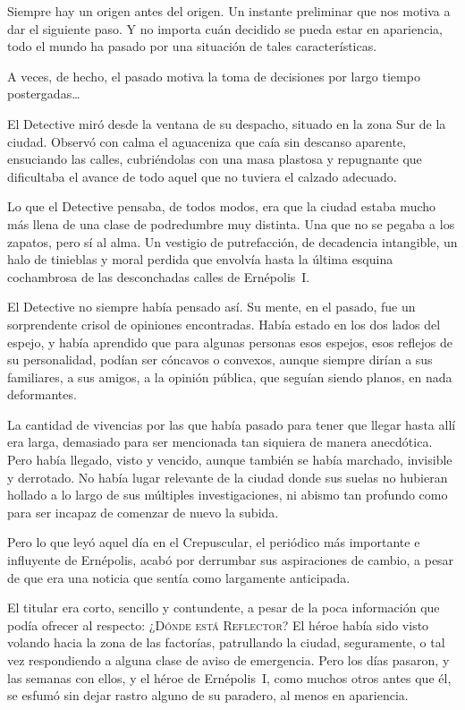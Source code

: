 Siempre hay un origen antes del origen. Un instante preliminar que nos motiva a dar el siguiente paso. Y no importa cuán decidido se pueda estar en apariencia, todo el mundo ha pasado por una situación de tales características.

A veces, de hecho, el pasado motiva la toma de decisiones por largo tiempo postergadas\dots

\fancyparbreak
El Detective miró desde la ventana de su despacho, situado en la zona Sur de la ciudad. Observó con calma el aguaceniza que caía sin descanso aparente, ensuciando las calles, cubriéndolas con una masa plastosa y repugnante que dificultaba el avance de todo aquel que no tuviera el calzado adecuado.

Lo que el Detective pensaba, de todos modos, era que la ciudad estaba mucho más llena de una clase de podredumbre muy distinta. Una que no se pegaba a los zapatos, pero sí al alma. Un vestigio de putrefacción, de decadencia intangible, un halo de tinieblas y moral perdida que envolvía hasta la última esquina cochambrosa de las desconchadas calles de Ernépolis~I.

El Detective no siempre había pensado así. Su mente, en el pasado, fue un sorprendente crisol de opiniones encontradas. Había estado en los dos lados del espejo, y había aprendido que para algunas personas esos espejos, esos reflejos de su personalidad, podían ser cóncavos o convexos, aunque siempre dirían a sus familiares, a sus amigos, a la opinión pública, que seguían siendo planos, en nada deformantes.

La cantidad de vivencias por las que había pasado para tener que llegar hasta allí era larga, demasiado para ser mencionada tan siquiera de manera anecdótica. Pero había llegado, visto y vencido, aunque también se había marchado, invisible y derrotado. No había lugar relevante de la ciudad donde sus suelas no hubieran hollado a lo largo de sus múltiples investigaciones, ni abismo tan profundo como para ser incapaz de comenzar de nuevo la subida.

Pero lo que leyó aquel día en el Crepuscular, el periódico más importante e influyente de Ernépolis, acabó por derrumbar sus aspiraciones de cambio, a pesar de que era una noticia que sentía como largamente anticipada.

El titular era corto, sencillo y contundente, a pesar de la poca información que podía ofrecer al respecto: \textsc{¿Dónde está Reflector?} El héroe había sido visto volando hacia la zona de las factorías, patrullando la ciudad, seguramente, o tal vez respondiendo a alguna clase de aviso de emergencia. Pero los días pasaron, y las semanas con ellos, y el héroe de Ernépolis~I, como muchos otros antes que él, se esfumó sin dejar rastro alguno de su paradero, al menos en apariencia.

